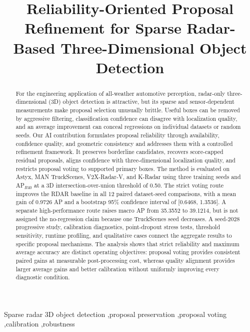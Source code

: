 \documentclass[preprint,12pt,times]{elsarticle}
\begin{document}
\begin{frontmatter}

\title{Reliability-Oriented Proposal Refinement for Sparse Radar-Based
Three-Dimensional Object Detection}

\begin{abstract}
For the engineering application of all-weather automotive perception,
radar-only three-dimensional (3D) object detection is attractive, but
its sparse and sensor-dependent measurements make proposal selection
unusually brittle. Useful boxes can be removed by aggressive filtering,
classification confidence can disagree with localization quality, and an
average improvement can conceal regressions on individual datasets or random
seeds. Our AI contribution formulates proposal reliability through
availability, confidence quality, and geometric consistency and addresses
them with a controlled refinement framework. It preserves borderline
candidates, recovers
score-capped residual proposals, aligns confidence with three-dimensional
localization quality, and restricts proposal voting to supported primary
boxes. The method is
evaluated on Astyx, MAN TruckScenes, V2X-Radar-V, and K-Radar using three
training seeds and AP$_{R40}$ at a 3D intersection-over-union threshold of
0.50. The strict voting route improves the RDAR baseline in all 12 paired
dataset-seed comparisons, with a mean gain of 0.9726 AP and a bootstrap 95\%
confidence interval of [0.6468, 1.3536]. A separate high-performance route
raises macro AP from 35.3552 to 39.1214, but is not assigned the no-regression
claim because one TruckScenes seed decreases. A seed-2028 progressive study,
calibration diagnostics, point-dropout stress tests, threshold sensitivity,
runtime profiling, and qualitative cases connect the aggregate results to
specific proposal mechanisms. The analysis shows that strict reliability and
maximum average accuracy are distinct operating objectives: proposal voting
provides consistent paired gains at measurable post-processing cost, whereas
quality alignment provides larger average gains and better calibration without
uniformly improving every diagnostic condition.
\end{abstract}

\begin{keyword}
Sparse radar 3D object detection \sep proposal preservation \sep proposal voting \sep calibration \sep robustness
\end{keyword}

\end{frontmatter}
\end{document}
